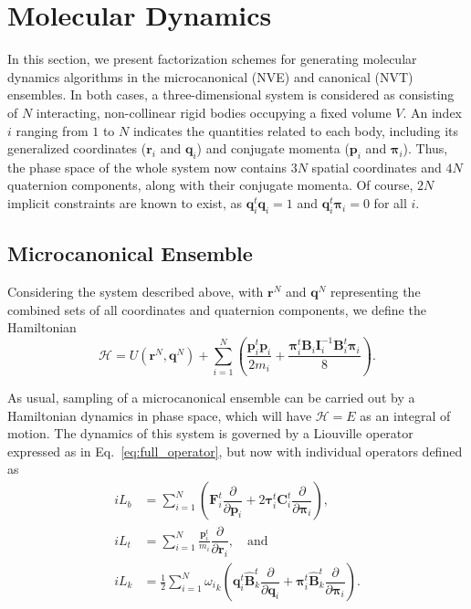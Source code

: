 \documentclass[aip,jcp,reprint,amsmath,amssymb,raggedbottom]{revtex4-1}
\newcommand{\mt}[1]{\boldsymbol{\mathbf{#1}}}           %
\newcommand{\vt}[1]{\boldsymbol{\mathbf{#1}}}           %
\newcommand{\tr}[1]{#1^t}                               %
\newcommand{\diff}[2]{\dfrac{\partial #1}{\partial #2}} %
\begin{document}
\section{Molecular Dynamics}
\label{sec:molecular_dynamics}

In this section, we present factorization schemes for generating molecular dynamics algorithms in the microcanonical (NVE) and canonical (NVT) ensembles. In both cases, a three-dimensional system is considered as consisting of $N$ interacting, non-collinear rigid bodies occupying a fixed volume $V$. An index $i$ ranging from $1$ to $N$ indicates the quantities related to each body, including its generalized coordinates ($\vt r_i$ and $\vt q_i$) and conjugate momenta ($\vt p_i$ and $\vt \pi_i$). Thus, the phase space of the whole system now contains $3N$ spatial coordinates and $4N$ quaternion components, along with their conjugate momenta. Of course, $2N$ implicit constraints are known to exist, as $\tr{\vt q}_i{\vt q}_i = 1$ and $\tr{\vt q}_i{\vt \pi}_i = 0$ for all $i$.

\subsection{Microcanonical Ensemble}

Considering the system described above, with $\vt r^N$ and $\vt q^N$ representing the combined sets of all coordinates and quaternion components, we define the Hamiltonian
\begin{equation}
\label{eq:H_NVE}
\mathcal{H} = U(\vt r^N,\vt q^N) + \sum_{i=1}^N \left(\frac{\tr{\vt p}_i{\vt p}_i}{2m_i} + \frac{\tr{\vt \pi}_i {\mt B}_i {\mt I}_i^{-1} \tr{\mt B}_i {\vt \pi}_i}{8}\right).
\end{equation}

As usual, sampling of a microcanonical ensemble can be carried out by a Hamiltonian dynamics in phase space, which will have $\mathcal{H} = E$ as an integral of motion. The dynamics of this system is governed by a Liouville operator expressed as in Eq.~\ref{eq:full_operator}, but now with individual operators defined as
\[
\begin{split}
i\!L_b &= \sum_{i=1}^N \left( \tr{\vt F}_i \diff{}{\vt p_i} + 2 \tr{\vt \tau}_i \tr{\mt C}_i \diff{}{\vt \pi_i} \right), \\
i\!L_t &= \sum_{i=1}^N \frac{\tr{\vt p}_i}{m_i}\diff{}{\vt r_i}, \quad \text{and} \\
i\!L_k &= \frac{1}{2} \sum_{i=1}^N {\omega_i}_k \left( \tr{\vt q}_i\tr{\hat{\mt B}_k} \diff{}{\vt q_i} + \tr{\vt \pi_i}\tr{\hat{\mt B}_k} \diff{}{\vt \pi_i} \right).
\end{split}
\]
\end{document}
